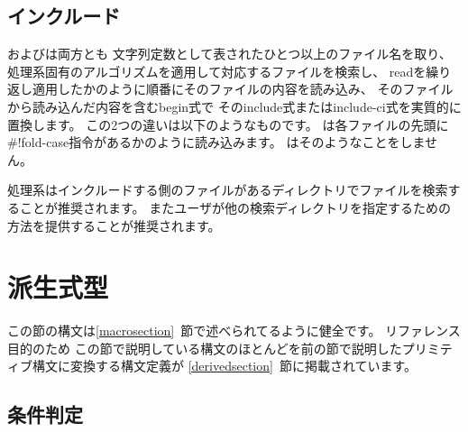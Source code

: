 \subsection{インクルード}\unsection
\label{inclusion}
\begin{entry}{%
}

\semantics
{}およびは両方とも
文字列定数として表されたひとつ以上のファイル名を取り、
処理系固有のアルゴリズムを適用して対応するファイルを検索し、
{\cf read}を繰り返し適用したかのように順番にそのファイルの内容を読み込み、
そのファイルから読み込んだ内容を含む{\cf begin}式で
その{\cf include}式または{\cf include-ci}式を実質的に置換します。
この2つの違いは以下のようなものです。
は各ファイルの先頭に{\cf{}\#!fold-case}指令があるかのように読み込みます。
はそのようなことをしません。

\begin{note}
処理系はインクルードする側のファイルがあるディレクトリでファイルを検索することが推奨されます。
またユーザが他の検索ディレクトリを指定するための方法を提供することが推奨されます。
\end{note}

\end{entry}

\section{派生式型}
\label{derivedexps}

この節の構文は\ref{macrosection}~節で述べられてるように健全です。
リファレンス目的のため
この節で説明している構文のほとんどを前の節で説明したプリミティブ構文に変換する構文定義が
\ref{derivedsection}~節に掲載されています。


\subsection{条件判定}\unsection


